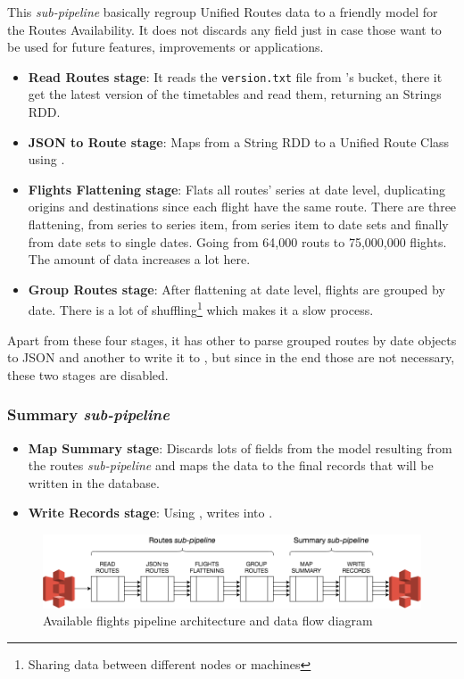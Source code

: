 This \textit{sub-pipeline} basically regroup Unified Routes data to a friendly model for the Routes Availability. It does not discards any field just in case those want to be used for future features, improvements or applications.

\begin{itemize}
    \item \textbf{Read Routes stage}: It reads the \texttt{version.txt} file from \squad's bucket, there it get the latest version of the timetables and read them, returning an Strings RDD.
    \item \textbf{JSON to Route stage}: Maps from a String RDD to a Unified Route Class using .
    \item \textbf{Flights Flattening stage}: Flats all routes' series at date level, duplicating origins and destinations since each flight have the same route. There are three flattening, from series to series item, from series item to date sets and finally from date sets to single dates. Going from 64,000 routs to 75,000,000 flights. The amount of data increases a lot here.
    \item \textbf{Group Routes stage}: After flattening at date level, flights are grouped by date. There is a lot of shuffling\footnote{Sharing data between different nodes or machines} which makes it a slow process.
\end{itemize}

Apart from these four stages, it has other to parse grouped routes by date objects to JSON\cite{json} and another to write it to , but since in the end those are not necessary, these two stages are disabled.

\subsubsection*{Summary \textit{sub-pipeline}}


\begin{itemize}
    \item \textbf{Map Summary stage}: Discards lots of fields from the model resulting from the routes \textit{sub-pipeline} and maps the data to the final records that will be written in the database.
    \item \textbf{Write Records stage}: Using , writes into .
\end{itemize}

\begin{figure}[H]
\centering
\includegraphics[scale=0.45]{diagrams/available-flights-pipeline-architecture.png}
\caption{Available flights pipeline architecture and data flow diagram}
\end{figure}

